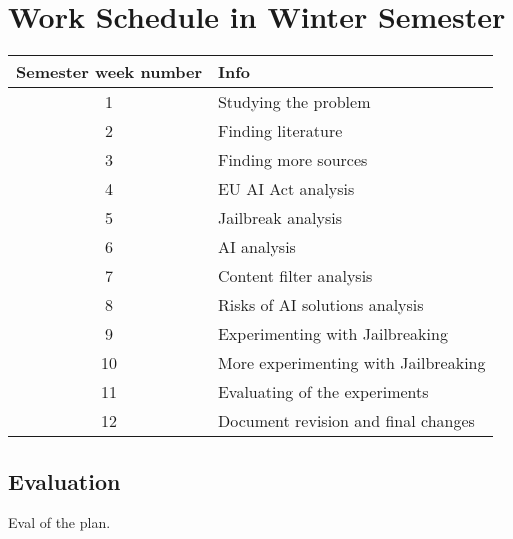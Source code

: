 \setcounter{figure}{0}
\setcounter{listing}{0}

\chapter{Work Schedule in Winter Semester \label{cha:work_schedule} }



\begin{table}[h]
    \centering
    \begin{tabular}{|c|l|}
    \hline
    \textbf{Semester week number} & \textbf{Info} \\ \hline

    1 & Studying the problem  \\ \hline
    2 & Finding literature \\ \hline
    3 & Finding more sources \\ \hline
    4 & EU AI Act analysis \\ \hline
    5 & Jailbreak analysis \\ \hline
    6 & AI analysis \\ \hline
    7 & Content filter analysis \\ \hline
    8 & Risks of AI solutions analysis \\ \hline
    9 & Experimenting with Jailbreaking \\ \hline
    10 & More experimenting with Jailbreaking \\ \hline
    11 & Evaluating of the experiments \\ \hline
    12 & Document revision and final changes \\ \hline
    \end{tabular}
\end{table}


\begin{refsegment}

\section{Evaluation}
Eval of the plan.

% 


\printbibliography[heading=referencessec,segment=\therefsegment,resetnumbers=true]

\end{refsegment}